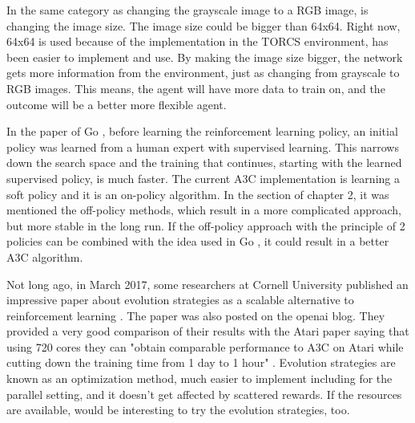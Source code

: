 In the same category as changing the grayscale image to a RGB image, is changing the image size. The image size could be bigger than 64x64. Right now, 64x64 is used because of the implementation in the TORCS environment, has been easier to implement and use. By making the image size bigger, the network gets more information from the environment, just as changing from grayscale to RGB images. This means, the agent will have more data to train on, and the outcome will be a better more flexible agent.

In the paper of Go \cite{Silver_2016}, before learning the reinforcement learning policy, an initial policy was learned from a human expert with supervised learning. This narrows down the search space and the training that continues, starting with the learned supervised policy, is much faster. The current A3C implementation is learning a soft policy and it is an on-policy algorithm. In the  section of chapter 2, it was mentioned the off-policy methods, which result in a more complicated approach, but more stable in the long run. If the off-policy approach with the principle of 2 policies can be combined with the idea used in Go \cite{Silver_2016}, it could result in a better A3C algorithm.

Not long ago, in March 2017, some researchers at Cornell University published an impressive paper about evolution strategies as a scalable alternative to reinforcement learning \cite{EvolStrat}. The paper was also posted on the openai blog. They provided a very good comparison of their results with the Atari paper \cite{DBLP:journals/corr/MnihKSGAWR13} saying that using 720 cores they can "obtain comparable performance to A3C on Atari while cutting down the training time from 1 day to 1 hour" \cite{EvolStrat}. Evolution strategies are known as an optimization method, much easier to implement including for the parallel setting, and it doesn't get affected by scattered rewards. If the resources are available, would be interesting to try the evolution strategies, too.